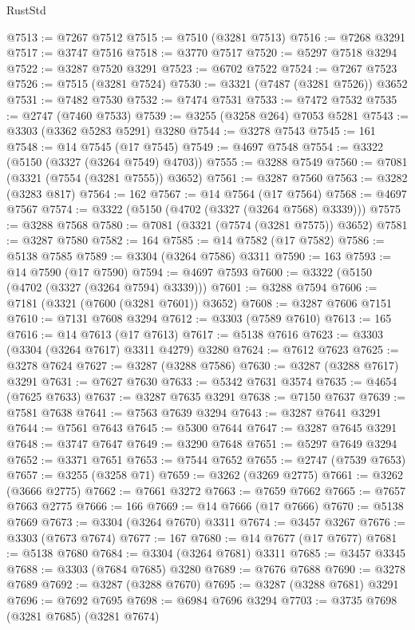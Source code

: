 \begin{lexlean}{RustStd}
\begin{coremodule}
{\begin{coremodule}
{{{{{{{{{{{{{{{{{{{{{{{{{{{{{{{{{@7513 := @7267 @7512
@7515 := @7510 (@3281 @7513)
@7516 := @7268 @3291
@7517 := @3747 @7516
@7518 := @3770 @7517
@7520 := @5297 @7518 @3294
@7522 := @3287 @7520 @3291
@7523 := @6702 @7522
@7524 := @7267 @7523
@7526 := @7515 (@3281 @7524)
@7530 := @3321 (@7487 (@3281 @7526)) @3652
@7531 := @7482 @7530
@7532 := @7474 @7531
@7533 := @7472 @7532
@7535 := @2747 (@7460 @7533)
@7539 := @3255 (@3258 @264) @7053 @5281
@7543 := @3303 (@3362 @5283 @5291) @3280
@7544 := @3278 @7543
@7545 := 161
@7548 := @14 @7545 (@17 @7545)
@7549 := @4697 @7548
@7554 := @3322 (@5150 (@3327 (@3264 @7549) @4703))
@7555 := @3288 @7549
@7560 := @7081 (@3321 (@7554 (@3281 @7555)) @3652)
@7561 := @3287 @7560
@7563 := @3282 (@3283 @817)
@7564 := 162
@7567 := @14 @7564 (@17 @7564)
@7568 := @4697 @7567
@7574 := @3322 (@5150 (@4702 (@3327 (@3264 @7568) @3339)))
@7575 := @3288 @7568
@7580 := @7081 (@3321 (@7574 (@3281 @7575)) @3652)
@7581 := @3287 @7580
@7582 := 164
@7585 := @14 @7582 (@17 @7582)
@7586 := @5138 @7585
@7589 := @3304 (@3264 @7586) @3311
@7590 := 163
@7593 := @14 @7590 (@17 @7590)
@7594 := @4697 @7593
@7600 := @3322 (@5150 (@4702 (@3327 (@3264 @7594) @3339)))
@7601 := @3288 @7594
@7606 := @7181 (@3321 (@7600 (@3281 @7601)) @3652)
@7608 := @3287 @7606 @7151
@7610 := @7131 @7608 @3294
@7612 := @3303 (@7589 @7610)
@7613 := 165
@7616 := @14 @7613 (@17 @7613)
@7617 := @5138 @7616
@7623 := @3303 (@3304 (@3264 @7617) @3311 @4279) @3280
@7624 := @7612 @7623
@7625 := @3278 @7624
@7627 := @3287 (@3288 @7586)
@7630 := @3287 (@3288 @7617) @3291
@7631 := @7627 @7630
@7633 := @5342 @7631 @3574
@7635 := @4654 (@7625 @7633)
@7637 := @3287 @7635 @3291
@7638 := @7150 @7637
@7639 := @7581 @7638
@7641 := @7563 @7639 @3294
@7643 := @3287 @7641 @3291
@7644 := @7561 @7643
@7645 := @5300 @7644
@7647 := @3287 @7645 @3291
@7648 := @3747 @7647
@7649 := @3290 @7648
@7651 := @5297 @7649 @3294
@7652 := @3371 @7651
@7653 := @7544 @7652
@7655 := @2747 (@7539 @7653)
@7657 := @3255 (@3258 @71)
@7659 := @3262 (@3269 @2775)
@7661 := @3262 (@3666 @2775)
@7662 := @7661 @3272
@7663 := @7659 @7662
@7665 := @7657 @7663 @2775
@7666 := 166
@7669 := @14 @7666 (@17 @7666)
@7670 := @5138 @7669
@7673 := @3304 (@3264 @7670) @3311
@7674 := @3457 @3267
@7676 := @3303 (@7673 @7674)
@7677 := 167
@7680 := @14 @7677 (@17 @7677)
@7681 := @5138 @7680
@7684 := @3304 (@3264 @7681) @3311
@7685 := @3457 @3345
@7688 := @3303 (@7684 @7685) @3280
@7689 := @7676 @7688
@7690 := @3278 @7689
@7692 := @3287 (@3288 @7670)
@7695 := @3287 (@3288 @7681) @3291
@7696 := @7692 @7695
@7698 := @6984 @7696 @3294
@7703 := @3735 @7698 (@3281 @7685) (@3281 @7674)
}}}}}}}}}}}}}}}}}}}}}}}}}}}}}}}}}
\end{coremodule}}
\end{coremodule}
\end{lexlean}
